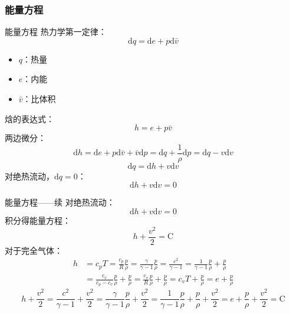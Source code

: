 \subsubsection{能量方程}
\begin{frame}{能量方程}
  热力学第一定律：
  \begin{equation*}
  \mathrm{d}q
  =
  \mathrm{d}e
  +
  p\mathrm{d}\bar{v}
  \end{equation*}
  \vspace*{-1.5em}
  \begin{itemize}
    \item $q$：热量
    \item $e$：内能
    \item $\bar{v}$：比体积
  \end{itemize}
  焓的表达式：
  \begin{equation*}
  h
  =
  e
  +
  p\bar{v}
  \end{equation*}
  两边微分：
  \begin{equation*}
  \mathrm{d}h
  =
  \mathrm{d}e
  +
  p\mathrm{d}\bar{v}
  +
  \bar{v}\mathrm{d}p
  =
  \mathrm{d}q
  +
  \frac{1}{\rho}\mathrm{d}p
  =
  \mathrm{d}q
  -
  v\mathrm{d}v
  \end{equation*}
  \begin{equation*}
  \mathrm{d}q
  =
  \mathrm{d}h
  +
  v\mathrm{d}v
  \end{equation*}
  对绝热流动，$\mathrm{d}q=0$：
  \begin{equation*}
  \mathrm{d}h
  +
  v\mathrm{d}v
  =
  0
  \end{equation*}
\end{frame}

\begin{frame}{能量方程——续}
  对绝热流动：
  \begin{equation*}
  \mathrm{d}h
  +
  v\mathrm{d}v
  =
  0
  \end{equation*}
  积分得能量方程：
  \begin{equation*}
  h
  +
  \frac{v^{2}}{2}
  =
  \mathrm{C}
  \end{equation*}
  对于完全气体：
  \begin{equation*}
    \begin{aligned}
  h
  &=
  c_{p}T
  =
  \frac{c_{p}}{R}
  \frac{p}{\rho}
  =
  \frac{\gamma}{\gamma-1}
  \frac{p}{\rho}
  =
  \frac{c^{2}}{\gamma-1}
  =
  \frac{1}{\gamma-1}
  \frac{p}{\rho}
  +
  \frac{p}{\rho}
  \\
  &=
  \frac{c_{v}}{c_{p}-c_{v}}
  \frac{p}{\rho}
  +
  \frac{p}{\rho}
  =
  \frac{c_{v}}{R}
  \frac{p}{\rho}
  +
  \frac{p}{\rho}
  =
  c_{v}T
  +
  \frac{p}{\rho}
  =
  e
  +
  \frac{p}{\rho}
    \end{aligned}
  \end{equation*}
  \begin{equation*}
    h
    +
    \frac{v^{2}}{2}
    =
    \frac{c^{2}}{\gamma-1}
    +
    \frac{v^{2}}{2}
    =
    \frac{\gamma}{\gamma-1}\frac{p}{\rho}
    +
    \frac{v^{2}}{2}
    =
  \frac{1}{\gamma-1}
  \frac{p}{\rho}
  +
  \frac{p}{\rho}
  +
  \frac{v^{2}}{2}
  =
  e
  +
  \frac{p}{\rho}
  +
  \frac{v^{2}}{2}
  =
  \mathrm{C}
  \end{equation*}
\end{frame}


